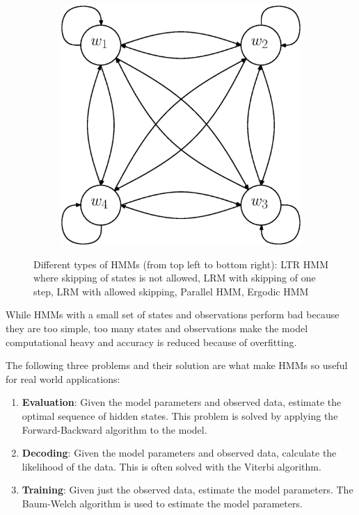 \documentclass[a4paper, oneside]{csthesis}
\begin{document}
\begin{figure}
        \begin{subfigure}[b]{0.25\textwidth}
                \centering
                \includegraphics[width=\textwidth]{figures/hmm-ltr4.eps}
                \caption{}
                \label{fig:hmm1}
        \end{subfigure}%



        \caption{Different types of HMMs (from top left to bottom right): LTR HMM where skipping of states is not allowed, LRM with skipping of one step, LRM with allowed skipping, Parallel HMM, Ergodic HMM}\label{fig:markov-models}
\end{figure}



While HMMs with a small set of states and observations perform bad because they are too simple, too many states and observations make the model computational heavy and accuracy is reduced because of overfitting.

The following three problems and their solution are what make HMMs so useful for real world applications:
\begin{enumerate}
\item \textbf{Evaluation}: Given the model parameters and observed data, estimate the optimal sequence of hidden states. This problem is solved by applying the Forward-Backward algorithm to the model.
\item \textbf{Decoding}: Given the model parameters and observed data, calculate the likelihood of the data. This is often solved with the Viterbi algorithm.
\item \textbf{Training}: Given just the observed data, estimate the model parameters. The Baum-Welch algorithm is used to estimate the model parameters.
\end{enumerate}
\end{document}
